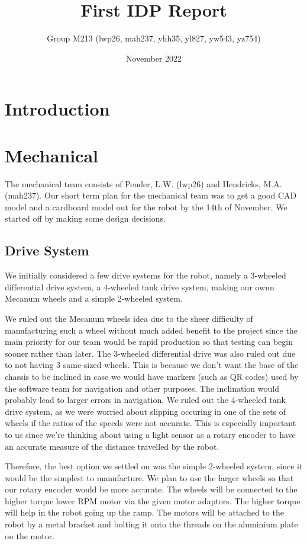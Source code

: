 \documentclass{article}
\title{First IDP Report}
\author{Group M213 (lwp26, mah237, yhh35, yl827, yw543, yz754)}
\date{November 2022}
\begin{document}
\maketitle

\section{Introduction}
    
\section{Mechanical}
\quad The mechanical team consists of Pender, L.W. (lwp26) and Hendricks, M.A.(mah237). Our short term plan for the mechanical team was to get a good CAD model and a cardboard model out for the robot by the 14th of November. We started off by making some design decisions.

\subsection{Drive System}
\quad \quad We initially considered a few drive systems for the robot, namely a 3-wheeled differential drive system, a 4-wheeled tank drive system, making our ownn Mecanum wheels and a simple 2-wheeled system. 

\quad We ruled out the Mecanum wheels idea due to the sheer difficulty of manufacturing such a wheel without much added benefit to the project since the main priority for our team would be rapid production so that testing can begin sooner rather than later. The 3-wheeled differential drive was also ruled out due to not having 3 same-sized wheels. This is because we don't want the base of the chassis to be inclined in case we would have markers (such as QR codes) used by the software team for navigation and other purposes. The inclination would probably lead to larger errors in navigation. We ruled out the 4-wheeled tank drive system, as we were worried about slipping occuring in one of the sets of wheels if the ratios of the speeds were not accurate. This is especially important to us since we're thinking about using a light sensor as a rotary encoder to have an accurate measure of the distance travelled by the robot.

\quad Therefore, the best option we settled on was the simple 2-wheeled system, since it would be the simplest to manufacture. We plan to use the larger wheels so that our rotary encoder would be more accurate. The wheels will be connected to the higher torque lower RPM motor via the given motor adaptors. The higher torque will help in the robot going up the ramp. The motors will be attached to the robot by a metal bracket and bolting it onto the threads on the aluminium plate on the motor.
\end{document}
